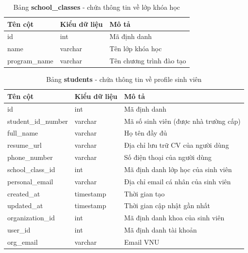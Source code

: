 \documentclass[./../main.tex]{subfiles}
\begin{document}
\begin{table}[H]
	\caption[Bảng school\_classes]{Bảng \textbf{school\_classes} - chứa thông tin về lớp khóa học}
	\label{tab:db_school_classes}
	\begin{tabular}{|l|l|l|}
	\hline
	\textbf{Tên cột} & \textbf{Kiểu dữ liệu} & \textbf{Mô tả}           \\ \hline
	id               & int                   & Mã định danh             \\ \hline
	name             & varchar               & Tên lớp khóa học         \\ \hline
	program\_name    & varchar               & Tên chương trình đào tạo \\ \hline
	\end{tabular}
\end{table}

\begin{table}[H]
	\caption[Bảng students]{Bảng \textbf{students} - chứa thông tin về profile sinh viên}
	\label{tab:db_students}
	\begin{tabularx}{\textwidth}{|l|l|X|}
	\hline
	\textbf{Tên cột}    & \textbf{Kiểu dữ liệu} & \textbf{Mô tả}                        \\ \hline
	id                  & int                   & Mã định danh                          \\ \hline
	student\_id\_number & varchar               & Mã số sinh viên (được nhà trường cấp) \\ \hline
	full\_name          & varchar               & Họ tên đầy đủ                         \\ \hline
	resume\_url         & varchar               & Địa chỉ lưu trữ CV của người dùng     \\ \hline
	phone\_number       & varchar               & Số điện thoại của người dùng          \\ \hline
	school\_class\_id   & int                   & Mã định danh lớp học của sinh viên    \\ \hline
	personal\_email     & varchar               & Địa chỉ email cá nhân của sinh viên   \\ \hline
	created\_at         & timestamp             & Thời gian tạo                         \\ \hline
	updated\_at         & timestamp             & Thời gian cập nhật gần nhất           \\ \hline
	organization\_id    & int                   & Mã định danh khoa của sinh viên       \\ \hline
	user\_id            & int                   & Mã định danh tài khoản                \\ \hline
	org\_email          & varchar               & Email VNU                             \\ \hline
	\end{tabularx}%
\end{table}
\end{document}
